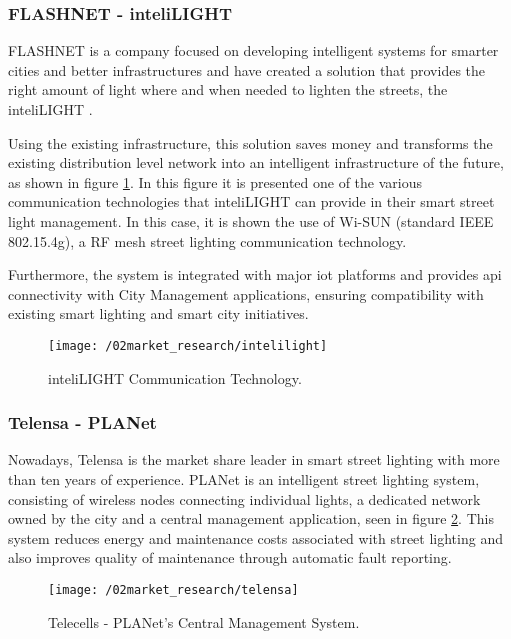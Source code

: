 \subsubsection{FLASHNET - inteliLIGHT}
FLASHNET is a company focused on developing intelligent systems for smarter cities and better infrastructures and have created a solution that provides the right amount of light where and when needed to lighten the streets, the inteliLIGHT \cite{inteli_light}.

Using the existing infrastructure, this solution saves money and transforms the existing distribution level network into an intelligent infrastructure of the future, as shown in figure \ref{fig:intelilight}. In this figure it is presented one of the various communication technologies that inteliLIGHT can provide in their smart street light management. In this case, it is shown the use of Wi-SUN (standard IEEE 802.15.4g), a RF mesh street lighting communication technology. \cite{wi_sun}


Furthermore, the system is integrated with major \ac{iot} platforms and provides \ac{api} connectivity with City Management applications, ensuring compatibility with existing smart lighting and smart city initiatives.

\begin{figure}[ht]
	\centering
	\texttt{[image: /02market\_research/intelilight]}
	\caption{inteliLIGHT Communication Technology.}
	\label{fig:intelilight}
\end{figure}

\subsubsection{Telensa - PLANet}
Nowadays, Telensa is the market share leader in smart street lighting with more than ten years of experience.\cite{telensa_solutions} PLANet is an intelligent street lighting system, consisting of wireless nodes connecting individual lights, a dedicated network owned by the city and a central management application, seen in figure \ref{fig:telensa}. This system reduces energy and maintenance costs associated with street lighting and also improves quality of maintenance through automatic fault reporting.

\begin{figure}[ht]
	\centering
	\texttt{[image: /02market\_research/telensa]}
	\caption{Telecells - PLANet's Central Management System.}
	\label{fig:telensa}
\end{figure}

